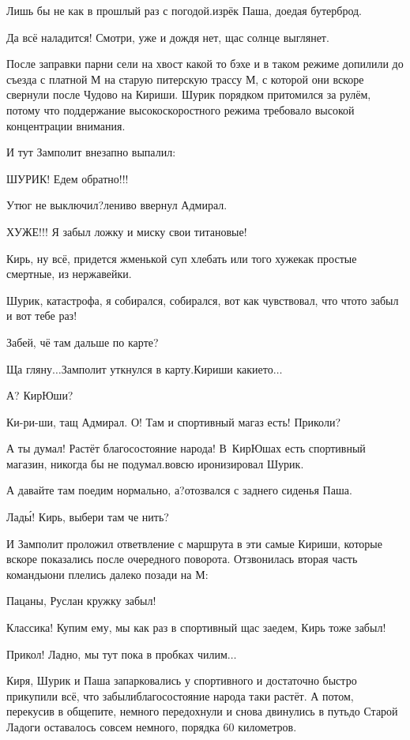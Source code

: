 \diagdash Лишь бы не как в прошлый раз с погодой.\mdash изрёк Паша, доедая бутерброд.

\diagdash Да всё наладится! Смотри, уже и дождя нет, щас солнце выглянет.

После заправки парни сели на хвост какой то бэхе и в таком режиме допилили до съезда с платной М на старую питерскую трассу М, с которой они вскоре свернули после Чудово на Кириши. Шурик порядком притомился за рулём, потому что поддержание высокоскоростного режима требовало высокой концентрации внимания. 

И тут Замполит внезапно выпалил:

\diagdash ШУРИК! Едем обратно!!!

\diagdash Утюг не выключил?\mdash лениво ввернул Адмирал.

\diagdash ХУЖЕ!!! Я забыл ложку и миску свои титановые!

\diagdash Кирь, ну всё, придется жменькой суп хлебать или того хуже\mdash как простые смертные, из нержавейки.

\diagdash Шурик, катастрофа, я собирался, собирался, вот как чувствовал, что что\sdash то забыл и вот тебе раз!

\diagdash Забей, чё там дальше по карте?

\diagdash Ща гляну$\ldots$\mdash Замполит уткнулся в карту.\mdash Кириши какие\sdash то$\ldots$

\diagdash А? КирЮши?

\diagdash Ки-ри-ши, тащ Адмирал. О! Там и спортивный магаз есть! Приколи?

\diagdash А ты думал! Растёт благосостояние народа! В~КирЮшах есть спортивный магазин, никогда бы не подумал.\mdash вовсю иронизировал Шурик.

\diagdash А давайте там поедим нормально, а?\mdash отозвался с заднего сиденья Паша.

\diagdash Лад\'{ы}! Кирь, выбери там че нить?

И Замполит проложил ответвление с маршрута в эти самые Кириши, которые вскоре показались после очередного поворота. Отзвонилась вторая часть команды\mdash они плелись далеко позади на М:

\diagdash Пацаны, Руслан кружку забыл!

\diagdash Классика! Купим ему, мы как раз в спортивный щас заедем, Кирь тоже забыл!

\diagdash Прикол! Ладно, мы тут пока в пробках чилим$\ldots$

Киря, Шурик и Паша запарковались у спортивного и достаточно быстро прикупили всё, что забыли\mdash благосостояние народа таки растёт. А потом, перекусив в общепите, немного передохнули и снова двинулись в путь\mdash до Старой Ладоги оставалось совсем немного, порядка 60 километров.

